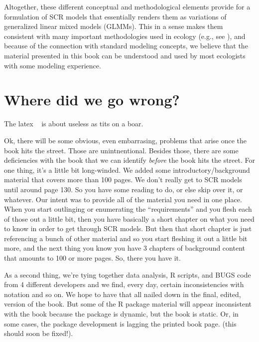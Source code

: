 Altogether, these different conceptual and methodological elements
provide for a formulation of SCR models that essentially renders them
as variations of generalized linear mixed models (GLMMs). This in a
sense makes them consistent with many important methodologies used in
ecology (e.g., see \citet{zuur_etal:2009, kery_etal:2010}), and
because of the connection with standard modeling concepts, we believe
that the material presented in this book can be understood and used by
most ecologists with some modeling experience.



\section*{Where did we go wrong?}

The latex \mbox{\tt ~} is about useless as tits on a boar.

Ok, there will be some obvious, even embarrasing, problems that arise
once the book hits the street. Those are unintnentional. Besides
those, there are some deficiencies with the book that we can identify
{\it before} the book hits the street. For one thing, it's a little
bit long-winded. We added some introductory/background material that
covers more than 100 pages. We don't really get to SCR models until
around page 130.  So you have some reading to do, or else skip over
it, or whatever. Our intent was to provide all of the material you
need in one place. When you start outlinging or enumerating the
``requirements'' and you flesh each of those out a little bit, then
you have basically a short chapter on what you need to know in order
to get through SCR models. But then that short chapter is just
referencing a bunch of other material and so you start fleshing it out
a little bit more, and the next thing you know you have 3 chapters of
background content that amounts to 100 or more pages.  So, there you
have it.  

As a second thing, we're tying together data analysis, R scripts, and
BUGS code from 4 different developers and we find, every day, certain
inconsistencies with notation and so on. We hope to have that all
nailed down in the final, edited, version of the book. But some of the
R package material will appear inconsistent with the book because the
package is dynamic, but the book is static. Or, in some cases, the
package development is lagging the printed book page. (this should
soon be fixed!). 






